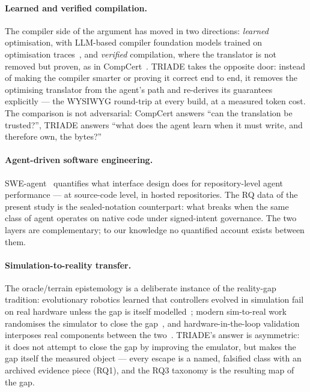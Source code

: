 \documentclass[10pt,a4paper]{article}
\begin{document}
\paragraph{Learned and verified compilation.} The compiler side of the
argument has moved in two directions: \emph{learned} optimisation, with
LLM-based compiler foundation models trained on optimisation
traces~\cite{cummins2024llmcompiler}, and \emph{verified} compilation,
where the translator is not removed but proven, as in
CompCert~\cite{leroycompcert}. TRIADE takes the opposite door: instead
of making the compiler smarter or proving it correct end to end, it
removes the optimising translator from the agent's path and re-derives
its guarantees explicitly --- the WYSIWYG round-trip at every build,
at a measured token cost. The comparison is not adversarial: CompCert
answers ``can the translation be trusted?'', TRIADE answers ``what does
the agent learn when it must write, and therefore own, the bytes?''

\paragraph{Agent-driven software engineering.} SWE-agent~\cite{yang2024sweagent}
quantifies what interface design does for repository-level agent
performance --- at source-code level, in hosted repositories. The RQ
data of the present study is the sealed-notation counterpart: what
breaks when the same class of agent operates on native code under
signed-intent governance. The two layers are complementary; to our
knowledge no quantified account exists between them.

\paragraph{Simulation-to-reality transfer.} The oracle/terrain
epistemology is a deliberate instance of the reality-gap tradition:
evolutionary robotics learned that controllers evolved in simulation
fail on real hardware unless the gap is itself modelled~\cite{jakobi1995reality};
modern sim-to-real work randomises the simulator to close the
gap~\cite{peng2018simtoreal}, and hardware-in-the-loop validation
interposes real components between the two~\cite{bacic2005hil}. TRIADE's
answer is asymmetric: it does not attempt to close the gap by improving
the emulator, but makes the gap itself the measured object --- every
escape is a named, falsified class with an archived evidence piece
(RQ1), and the RQ3 taxonomy is the resulting map of the gap.
\end{document}
